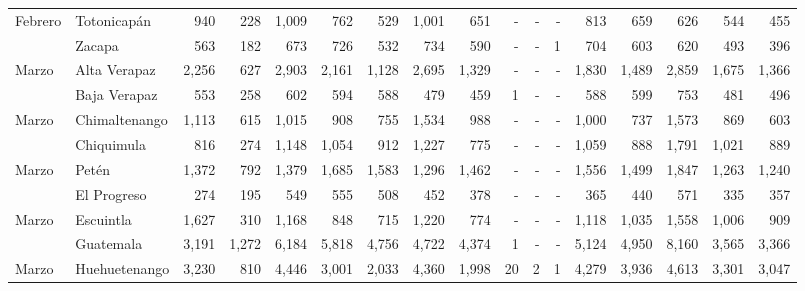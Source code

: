 \begin{landscape}
\begin{center}
\begin{longtable}{llrrrrrrrrrrrrrrr}
\multicolumn{1}{l}{	\footnotesize	 Febrero 	}&	 Totonicapán 	&	 940 	&	 228 	&	 1,009 	&	 762 	&	 529 	&	 1,001 	&	 651 	&	 -   	&	 -   	&	 -   	&	 813 	&	 659 	&	 626 	&	 544 	&	 455 	\\
\rowcolor{color1!5!white}\multicolumn{1}{l}{	\footnotesize	 Febrero 	}&	 Zacapa 	&	 563 	&	 182 	&	 673 	&	 726 	&	 532 	&	 734 	&	 590 	&	 -   	&	 -   	&	 1 	&	 704 	&	 603 	&	 620 	&	 493 	&	 396 	\\
\multicolumn{1}{l}{	\footnotesize	 Marzo 	}&	 Alta Verapaz 	&	 2,256 	&	 627 	&	 2,903 	&	 2,161 	&	 1,128 	&	 2,695 	&	 1,329 	&	 -   	&	 -   	&	 -   	&	 1,830 	&	 1,489 	&	 2,859 	&	 1,675 	&	 1,366 	\\
\rowcolor{color1!5!white}\multicolumn{1}{l}{	\footnotesize	 Marzo 	}&	 Baja Verapaz 	&	 553 	&	 258 	&	 602 	&	 594 	&	 588 	&	 479 	&	 459 	&	 1 	&	 -   	&	 -   	&	 588 	&	 599 	&	 753 	&	 481 	&	 496 	\\
\multicolumn{1}{l}{	\footnotesize	 Marzo 	}&	 Chimaltenango 	&	 1,113 	&	 615 	&	 1,015 	&	 908 	&	 755 	&	 1,534 	&	 988 	&	 -   	&	 -   	&	 -   	&	 1,000 	&	 737 	&	 1,573 	&	 869 	&	 603 	\\
\rowcolor{color1!5!white}\multicolumn{1}{l}{	\footnotesize	 Marzo 	}&	 Chiquimula 	&	 816 	&	 274 	&	 1,148 	&	 1,054 	&	 912 	&	 1,227 	&	 775 	&	 -   	&	 -   	&	 -   	&	 1,059 	&	 888 	&	 1,791 	&	 1,021 	&	 889 	\\
\multicolumn{1}{l}{	\footnotesize	 Marzo 	}&	 Petén 	&	 1,372 	&	 792 	&	 1,379 	&	 1,685 	&	 1,583 	&	 1,296 	&	 1,462 	&	 -   	&	 -   	&	 -   	&	 1,556 	&	 1,499 	&	 1,847 	&	 1,263 	&	 1,240 	\\
\rowcolor{color1!5!white}\multicolumn{1}{l}{	\footnotesize	 Marzo 	}&	 El Progreso 	&	 274 	&	 195 	&	 549 	&	 555 	&	 508 	&	 452 	&	 378 	&	 -   	&	 -   	&	 -   	&	 365 	&	 440 	&	 571 	&	 335 	&	 357 	\\
\multicolumn{1}{l}{	\footnotesize	 Marzo 	}&	 Escuintla 	&	 1,627 	&	 310 	&	 1,168 	&	 848 	&	 715 	&	 1,220 	&	 774 	&	 -   	&	 -   	&	 -   	&	 1,118 	&	 1,035 	&	 1,558 	&	 1,006 	&	 909 	\\
\rowcolor{color1!5!white}\multicolumn{1}{l}{	\footnotesize	 Marzo 	}&	 Guatemala 	&	 3,191 	&	 1,272 	&	 6,184 	&	 5,818 	&	 4,756 	&	 4,722 	&	 4,374 	&	 1 	&	 -   	&	 -   	&	 5,124 	&	 4,950 	&	 8,160 	&	 3,565 	&	 3,366 	\\
\multicolumn{1}{l}{	\footnotesize	 Marzo 	}&	 Huehuetenango 	&	 3,230 	&	 810 	&	 4,446 	&	 3,001 	&	 2,033 	&	 4,360 	&	 1,998 	&	 20 	&	 2 	&	 1 	&	 4,279 	&	 3,936 	&	 4,613 	&	 3,301 	&	 3,047 	\\

\end{longtable}
\end{center}
\end{landscape}
